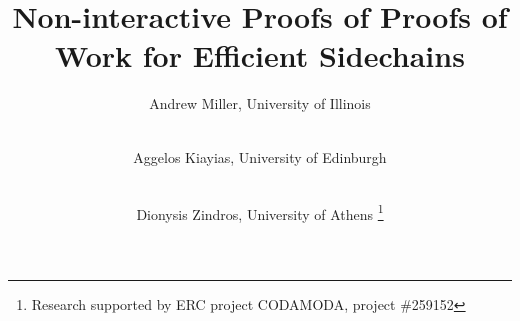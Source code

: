 \title{Non-interactive Proofs of Proofs of Work for Efficient Sidechains}
\author{Andrew Miller, University of Illinois \and \\
        Aggelos Kiayias, University of Edinburgh \and \\
        Dionysis Zindros, University of Athens \fnmsep \thanks{Research supported by ERC project CODAMODA, project \#259152}}
\maketitle
